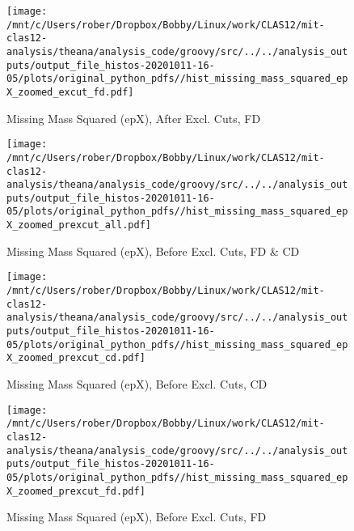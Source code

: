 \documentclass{article}
\begin{document}
\begin{landscape}
    \begin{figure}[h]
        \centering

        \texttt{[image: /mnt/c/Users/rober/Dropbox/Bobby/Linux/work/CLAS12/mit-clas12-analysis/theana/analysis\_code/groovy/src/../../analysis\_outputs/output\_file\_histos-20201011-16-05/plots/original\_python\_pdfs//hist\_missing\_mass\_squared\_epX\_zoomed\_excut\_fd.pdf]}
        \captionsetup{textformat=empty,labelformat=blank}
        \caption{Missing Mass Squared (epX), After Excl. Cuts, FD}
    \end{figure}
    \clearpage
    
    \begin{figure}[h]
        \centering

        \texttt{[image: /mnt/c/Users/rober/Dropbox/Bobby/Linux/work/CLAS12/mit-clas12-analysis/theana/analysis\_code/groovy/src/../../analysis\_outputs/output\_file\_histos-20201011-16-05/plots/original\_python\_pdfs//hist\_missing\_mass\_squared\_epX\_zoomed\_prexcut\_all.pdf]}
        \captionsetup{textformat=empty,labelformat=blank}
        \caption{Missing Mass Squared (epX), Before Excl. Cuts, FD \& CD}
    \end{figure}
    \clearpage
    
    \begin{figure}[h]
        \centering

        \texttt{[image: /mnt/c/Users/rober/Dropbox/Bobby/Linux/work/CLAS12/mit-clas12-analysis/theana/analysis\_code/groovy/src/../../analysis\_outputs/output\_file\_histos-20201011-16-05/plots/original\_python\_pdfs//hist\_missing\_mass\_squared\_epX\_zoomed\_prexcut\_cd.pdf]}
        \captionsetup{textformat=empty,labelformat=blank}
        \caption{Missing Mass Squared (epX), Before Excl. Cuts, CD}
    \end{figure}
    \clearpage
    
    \begin{figure}[h]
        \centering

        \texttt{[image: /mnt/c/Users/rober/Dropbox/Bobby/Linux/work/CLAS12/mit-clas12-analysis/theana/analysis\_code/groovy/src/../../analysis\_outputs/output\_file\_histos-20201011-16-05/plots/original\_python\_pdfs//hist\_missing\_mass\_squared\_epX\_zoomed\_prexcut\_fd.pdf]}
        \captionsetup{textformat=empty,labelformat=blank}
        \caption{Missing Mass Squared (epX), Before Excl. Cuts, FD}
    \end{figure}
    \clearpage
    
    \begin{figure}[h]
        \centering


\end{figure}
\end{landscape}
\end{document}
